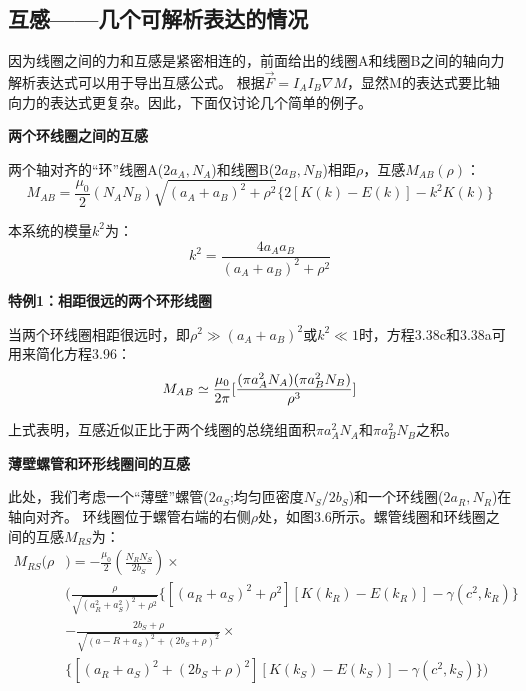 \subsection{互感——几个可解析表达的情况}
因为线圈之间的力和互感是紧密相连的，前面给出的线圈A和线圈B之间的轴向力解析表达式可以用于导出互感公式。
根据$\vec{F}=I_A I_B \nabla M$，显然M的表达式要比轴向力的表达式更复杂。因此，下面仅讨论几个简单的例子。

\textbf{两个环线圈之间的互感} 

两个轴对齐的“环”线圈A($2a_A,N_A$)和线圈B($2a_B,N_B$)相距$\rho$，互感$M_{AB}(\rho)$：
  \begin{equation}
M_{AB}=\frac{\mu_0}{2}(N_AN_B)\sqrt{(a_A+a_B)^2+\rho^2}\{2[K(k)-E(k)]-k^2K(k)\}%
\end{equation}

本系统的模量$k^2$为：
\begin{equation*}
k^2=\frac{4a_Aa_B}{(a_A+a_B)^2+\rho^2}%
\end{equation*}

\textbf{特例1：相距很远的两个环形线圈} 

  当两个环线圈相距很远时，即$\rho^2\gg(a_A+a_B)^2$或$k^2\ll 1$时，方程3.38c和3.38a可用来简化方程3.96：
\begin{equation}
M_{AB}\simeq\frac{\mu_0}{2\pi}[\frac{(\pi a_A^2N_A)(\pi a_B^2N_B)}{\rho^3}]\\%
\end{equation}

上式表明，互感近似正比于两个线圈的总绕组面积$\pi a_A^2 N_A$和$\pi a_B^2 N_B$之积。

\textbf{薄壁螺管和环形线圈间的互感} 

  此处，我们考虑一个“薄壁”螺管($2a_S$;均匀匝密度$N_S/2b_S$)和一个环线圈($2a_R,N_R$)在轴向对齐。
  环线圈位于螺管右端的右侧$\rho$处，如图3.6所示。螺管线圈和环线圈之间的互感$M_{RS}$为：
  \begin{equation}
  \begin{split}
M_{RS}(\rho&)=-\frac{\mu_0}{2}(\frac{N_RN_S}{2b_S})\times\\
&(\frac{\rho}{\sqrt{(a_R^2+a_S^2)^2+\rho^2}}\{[(a_R+a_S)^2+\rho^2][K(k_R)-E(k_R)]-\gamma(c^2,k_R)\}\\
&-\frac{2b_S+\rho}{\sqrt{(a-R+a_S)^2+(2b_S+\rho)^2}}\times\\
&\{[(a_R+a_S)^2+(2b_S+\rho)^2][K(k_S)-E(k_S)]-\gamma(c^2,k_S)\})%
  \end{split}
\end{equation}

